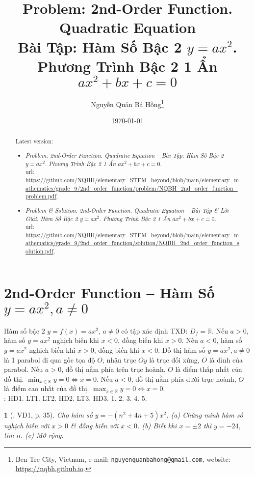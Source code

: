 \documentclass{article}
\title{Problem: 2nd-Order Function. Quadratic Equation\\Bài Tập: Hàm Số Bậc 2 $y = ax^2$. Phương Trình Bậc 2 1 Ẩn $ax^2 + bx + c = 0$}
\author{Nguyễn Quản Bá Hồng\footnote{Ben Tre City, Vietnam, e-mail: \texttt{nguyenquanbahong@gmail.com}, website: \url{https://nqbh.github.io}.}}
\date{\today}
\newtheorem{baitoan}{}
\begin{document}
\maketitle
\begin{abstract}
	Latest version:
	\begin{itemize}
		\item \textit{Problem: 2nd-Order Function. Quadratic Equation -- Bài Tập: Hàm Số Bậc 2 $y = ax^2$. Phương Trình Bậc 2 1 Ẩn $ax^2 + bx + c = 0$}.\\{\sc url}: \url{https://github.com/NQBH/elementary_STEM_beyond/blob/main/elementary_mathematics/grade_9/2nd_order_function/problem/NQBH_2nd_order_function_problem.pdf}.
		\item \textit{Problem \& Solution: 2nd-Order Function. Quadratic Equation -- Bài Tập \& Lời Giải: Hàm Số Bậc 2 $y = ax^2$. Phương Trình Bậc 2 1 Ẩn $ax^2 + bx + c = 0$}.\\{\sc url}: \url{https://github.com/NQBH/elementary_STEM_beyond/blob/main/elementary_mathematics/grade_9/2nd_order_function/solution/NQBH_2nd_order_function_solution.pdf}.
	\end{itemize}
\end{abstract}
\tableofcontents


\section{2nd-Order Function -- Hàm Số $y = ax^2,a\ne0$}
 Hàm số bậc 2 $y = f(x) = ax^2$, $a\ne0$ có tập xác định TXĐ: $D_f = \mathbb{R}$. Nếu $a > 0$, hàm số $y = ax^2$ nghịch biến khi $x < 0$, đồng biến khi $x > 0$. Nếu $a < 0$, hàm số $y = ax^2$ nghịch biến khi $x > 0$, đồng biến khi $x < 0$.  Đồ thị hàm số $y = ax^2,a\ne0$ là 1 parabol đi qua gốc tọa độ $O$, nhận trục $Oy$ là trục đối xứng, $O$ là đỉnh của parabol. Nếu $a > 0$, đồ thị nằm phía trên trục hoành, $O$ là điểm thấp nhất của đồ thị. $\min_{x\in\mathbb{R}} y = 0\Leftrightarrow x = 0$. Nếu $a < 0$, đồ thị nằm phía dưới trục hoành, $O$ là điểm cao nhất của đồ thị. $\max_{x\in\mathbb{R}} y = 0\Leftrightarrow x = 0$.\\

\noindent\cite[Chap. VII, \S1, pp. 46--51]{SGK_Toan_9_Canh_Dieu_tap_2}: HD1. LT1. LT2. HD2. LT3. HD3. 1. 2. 3. 4. 5.

\begin{baitoan}[\cite{Binh_boi_duong_Toan_9_tap_2}, VD1, p. 35]
	Cho hàm số $y = -(n^2 + 4n + 5)x^2$. (a) Chứng minh hàm số nghịch biến với $x > 0$ \& đồng biến với $x < 0$. (b) Biết khi $x = \pm2$ thì $y = -24$, tìm $n$. (c) Mở rộng.
\end{baitoan}
\end{document}
